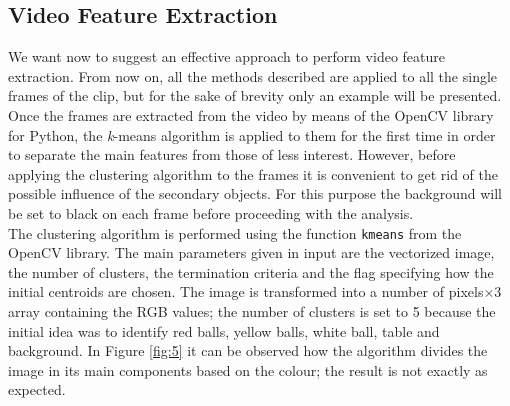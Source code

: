 \documentclass{usiinftr}
\begin{document}
\subsection{Video Feature Extraction}
We want now to suggest an effective approach to perform video feature extraction. From now on, all the methods described are applied to all the single frames of the clip, but for the sake of brevity only an example will be presented.  \\
Once the frames are extracted from the video by means of the OpenCV library for Python, the \textit{k}-means algorithm is applied to them for the first time in order to separate the main features from those of less interest. However, before applying the clustering algorithm to the frames it is convenient to get rid of the possible influence of the secondary objects. For this purpose the background will be set to black on each frame before proceeding with the analysis. \\
The clustering algorithm is performed using the function \texttt{kmeans} from the OpenCV library. The main parameters given in input are the vectorized image, the number of clusters, the termination criteria  and the flag specifying how the initial centroids are chosen. The image is transformed into a number of pixels$\times 3$ array containing the RGB values; the number of clusters is set to 5 because the initial idea was to identify red balls, yellow balls, white ball, table and background. 
In Figure \ref{fig:5} it can be observed how the algorithm divides the image in its main components based on the colour; the result is not exactly as expected. 
\end{document}
